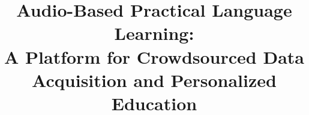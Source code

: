 \documentclass[a4paper]{article}
\title{Audio-Based Practical Language Learning:\\A Platform for Crowdsourced Data Acquisition and Personalized Education}
\begin{document}
\maketitle




%
%
%
%
%

\eightpt
  
  
  
\end{document}
